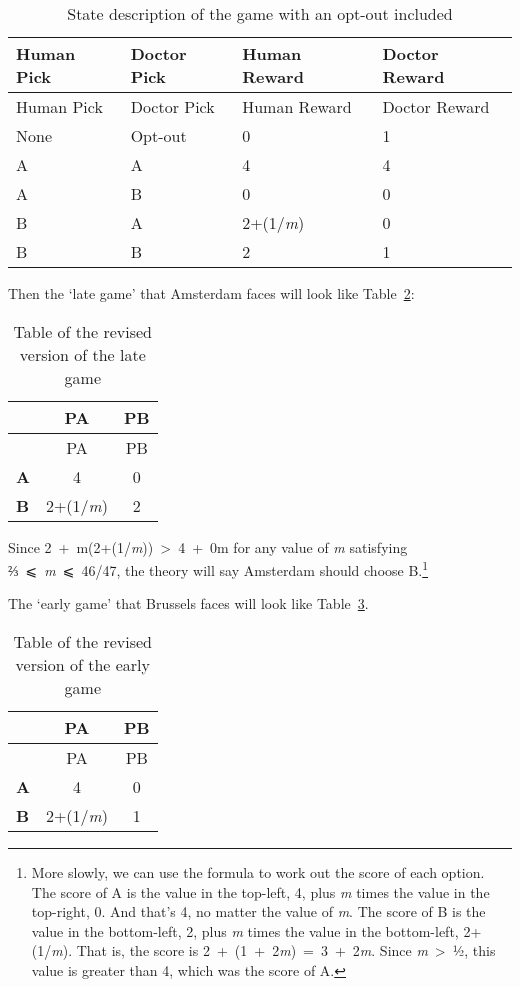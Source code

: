 \documentclass[
  10pt,
  letterpaper,
  DIV=11,
  numbers=noendperiod,
  twoside]{scrartcl}
\begin{document}
\begin{longtable}[]{@{}llll@{}}
\caption{State description of the game with an opt-out
included}\label{tbl-revised-game}\tabularnewline
\toprule\noalign{}
Human Pick & Doctor Pick & Human Reward & Doctor Reward \\
\midrule\noalign{}
\endfirsthead
\toprule\noalign{}
Human Pick & Doctor Pick & Human Reward & Doctor Reward \\
\midrule\noalign{}
\endhead
\bottomrule\noalign{}
\endlastfoot
None & Opt-out & 0 & 1 \\
A & A & 4 & 4 \\
A & B & 0 & 0 \\
B & A & 2+(1/\emph{m}) & 0 \\
B & B & 2 & 1 \\
\end{longtable}

Then the `late game' that Amsterdam faces will look like
Table~\ref{tbl-revised-late}:

\begin{longtable}[]{@{}lcc@{}}
\caption{Table of the revised version of the late
game}\label{tbl-revised-late}\tabularnewline
\toprule\noalign{}
& PA & PB \\
\midrule\noalign{}
\endfirsthead
\toprule\noalign{}
& PA & PB \\
\midrule\noalign{}
\endhead
\bottomrule\noalign{}
\endlastfoot
\textbf{A} & 4 & 0 \\
\textbf{B} & 2+(1/\emph{m}) & 2 \\
\end{longtable}

Since 2~+~m(2+(1/\emph{m}))~\textgreater~4~+~0m for any value of
\emph{m} satisfying ⅔~⩽~\emph{m}~⩽~46/47, the theory will say Amsterdam
should choose B.\footnote{More slowly, we can use the formula to work
  out the score of each option. The score of A is the value in the
  top-left, 4, plus \emph{m} times the value in the top-right, 0. And
  that's 4, no matter the value of \emph{m}. The score of B is the value
  in the bottom-left, 2, plus \emph{m} times the value in the
  bottom-left, 2+(1/\emph{m}). That is, the score is
  2~+~(1~+~2\emph{m})~=~3~+~2\emph{m}. Since \emph{m}~\textgreater~½,
  this value is greater than 4, which was the score of A.}

The `early game' that Brussels faces will look like
Table~\ref{tbl-revised-early}.

\begin{longtable}[]{@{}lcc@{}}
\caption{Table of the revised version of the early
game}\label{tbl-revised-early}\tabularnewline
\toprule\noalign{}
& PA & PB \\
\midrule\noalign{}
\endfirsthead
\toprule\noalign{}
& PA & PB \\
\midrule\noalign{}
\endhead
\bottomrule\noalign{}
\endlastfoot
\textbf{A} & 4 & 0 \\
\textbf{B} & 2+(1/\emph{m}) & 1 \\
\end{longtable}
\end{document}
